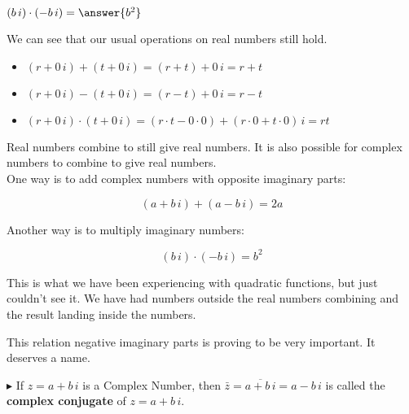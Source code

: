 \documentclass{ximera}
\begin{document}
\begin{question}


\item   $(b \, i) \cdot  (-b \, i) = \answer{b^2}$


\end{question}






We can see that our usual operations on real numbers still hold.

\begin{itemize}
\item $(r + 0 \, i) + (t + 0 \, i) = (r + t) + 0 \, i = r + t$ \\ 
\item $(r + 0 \, i) - (t + 0 \, i) = (r - t) + 0 \, i = r - t$ \\ 
\item $(r + 0 \, i) \cdot (t + 0 \, i) = (r \cdot t - 0 \cdot 0) + (r \cdot 0 + t \cdot 0) \, i = r t$ \\ 
\end{itemize}


Real numbers combine to still give real numbers.  It is also possible for complex numbers to combine to give real numbers. \\


One way is to add complex numbers with opposite imaginary parts:

\[
(a + b \, i) + (a - b \, i) = 2a
\]



Another way is to multiply imaginary numbers:

\[
(b \, i) \cdot (-b \, i) = b^2
\]



This is what we have been experiencing with quadratic functions, but just couldn't see it.  We have had numbers outside the real numbers combining and the result landing inside the numbers.




This relation negative imaginary parts is proving to be very important.  It deserves a name.


\textbf{\textcolor{red!90!darkgray}{$\blacktriangleright$}} If $z = a + b \, i$ is a Complex Number, then $\bar{z} = \overline{a + b \, i} = a - b \, i$ is called the \textbf{\textcolor{purple!85!blue}{complex conjugate}} of $z = a + b \, i$.
\end{document}
